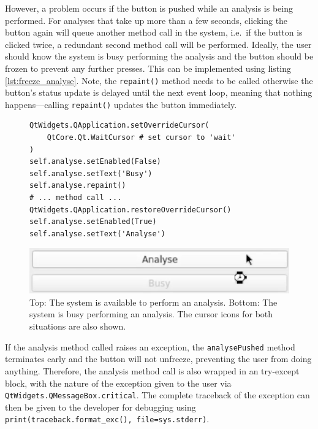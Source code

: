 \documentclass[12pt]{article}
\begin{document}
However, a problem occurs if the button is pushed while an analysis is being performed. For analyses that take up more than a few seconds, clicking the button again will queue another method call in the system, i.e.~if the button is clicked twice, a redundant second method call will be performed. Ideally, the user should know the system is busy performing the analysis and the button should be frozen to prevent any further presses. This can be implemented using listing \ref{lst:freeze_analyse}. Note, the \texttt{repaint()} method needs to be called otherwise the button's status update is delayed until the next event loop, meaning that nothing happens---calling \texttt{repaint()} updates the button immediately.
\begin{figure}[h]
    \centering
    \begin{minipage}[b]{.57\textwidth}
        \begin{verbatim}
QtWidgets.QApplication.setOverrideCursor(
    QtCore.Qt.WaitCursor # set cursor to 'wait'
)
self.analyse.setEnabled(False)
self.analyse.setText('Busy')
self.analyse.repaint()
# ... method call ...
QtWidgets.QApplication.restoreOverrideCursor()
self.analyse.setEnabled(True)
self.analyse.setText('Analyse')
        \end{verbatim}
        \label{lst:freeze_analyse}
    \end{minipage}\hfill\begin{minipage}[b]{.4\textwidth}
        \centering
        \includegraphics[width=\textwidth]{img/busy.png}
        \caption{Top: The system is available to perform an analysis. Bottom: The system is busy performing an analysis. The cursor icons for both situations are also shown.}
        \label{fig:busy}
    \end{minipage}
\end{figure}

If the analysis method called raises an exception, the \texttt{analysePushed} method terminates early and the button will not unfreeze, preventing the user from doing anything. Therefore, the analysis method call is also wrapped in an try-except block, with the nature of the exception given to the user via \texttt{QtWidgets.QMessageBox.critical}. The complete traceback of the exception can then be given to the developer for debugging using
\texttt{print(traceback.format_exc(), file=sys.stderr)}.
\end{document}
